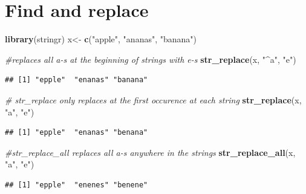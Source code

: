 \documentclass[]{book}
\newenvironment{Shaded}{\begin{snugshade}}{\end{snugshade}}
\newcommand{\KeywordTok}[1]{\textcolor[rgb]{0.13,0.29,0.53}{\textbf{#1}}}
\newcommand{\StringTok}[1]{\textcolor[rgb]{0.31,0.60,0.02}{#1}}
\newcommand{\CommentTok}[1]{\textcolor[rgb]{0.56,0.35,0.01}{\textit{#1}}}
\newcommand{\NormalTok}[1]{#1}
\begin{document}
\section{Find and replace}\label{find-and-replace}

\begin{Shaded}
\begin{Highlighting}[]
\KeywordTok{library}\NormalTok{(stringr)}
\NormalTok{x<-}\StringTok{ }\KeywordTok{c}\NormalTok{(}\StringTok{"apple"}\NormalTok{, }\StringTok{"ananas"}\NormalTok{, }\StringTok{"banana"}\NormalTok{)}

\CommentTok{#replaces all a-s at the beginning of strings with e-s}
\KeywordTok{str_replace}\NormalTok{(x, }\StringTok{"^a"}\NormalTok{, }\StringTok{"e"}\NormalTok{) }
\end{Highlighting}
\end{Shaded}

\begin{verbatim}
## [1] "epple"  "enanas" "banana"
\end{verbatim}

\begin{Shaded}
\begin{Highlighting}[]
\CommentTok{# str_replace only replaces at the first occurence at each string}
\KeywordTok{str_replace}\NormalTok{(x, }\StringTok{"a"}\NormalTok{, }\StringTok{"e"}\NormalTok{) }
\end{Highlighting}
\end{Shaded}

\begin{verbatim}
## [1] "epple"  "enanas" "benana"
\end{verbatim}

\begin{Shaded}
\begin{Highlighting}[]
\CommentTok{#str_replace_all replaces all a-s anywhere in the strings}
\KeywordTok{str_replace_all}\NormalTok{(x, }\StringTok{"a"}\NormalTok{, }\StringTok{"e"}\NormalTok{) }
\end{Highlighting}
\end{Shaded}

\begin{verbatim}
## [1] "epple"  "enenes" "benene"
\end{verbatim}

\begin{Shaded}
\end{Shaded}
\end{document}
